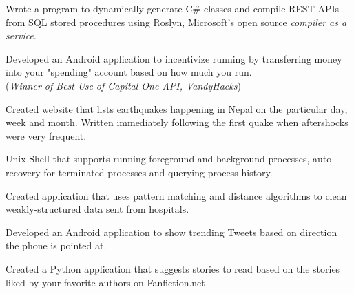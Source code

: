 \documentclass[letterpaper]{deedy-resume} %
\begin{document}
\begin{minipage}[t]{0.66\textwidth}
Wrote a program to dynamically generate C\# classes and compile REST APIs from SQL stored procedures using Roslyn, Microsoft's open source \textit{compiler as a service}.

\sectionspace %


Developed an Android application to incentivize running by transferring money into your "spending" account based on how much you run. \\
(\textit{Winner of Best Use of Capital One API, VandyHacks})

\sectionspace %



Created website that lists  earthquakes happening in Nepal on the particular day, week and month. Written immediately following the first quake when aftershocks were very frequent.

\sectionspace %



Unix Shell that  supports running foreground and background processes, auto-recovery for terminated processes and querying process history.

\sectionspace %


Created application that uses pattern matching and distance algorithms to clean weakly-structured data sent from hospitals. 

\sectionspace %


Developed an Android application to show trending  Tweets based on direction the phone is pointed at.
\sectionspace %


Created a Python application that suggests stories to read based on the stories liked by your favorite authors on Fanfiction.net


\end{minipage}
\end{document}
